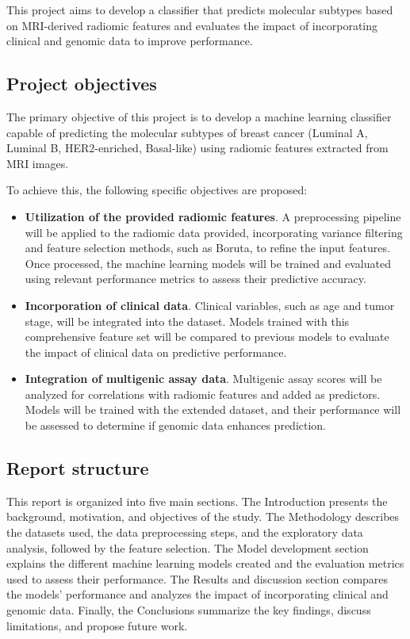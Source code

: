 \documentclass[conference]{IEEEtran}
\begin{document}
This project aims to develop a classifier that predicts molecular subtypes based on MRI-derived radiomic features and evaluates the impact of incorporating clinical and genomic data to improve performance.

\subsection{Project objectives}

The primary objective of this project is to develop a machine learning classifier capable of predicting the molecular subtypes of breast cancer (Luminal A, Luminal B, HER2-enriched, Basal-like) using radiomic features extracted from MRI images.

To achieve this, the following specific objectives are proposed:

\begin{itemize}
	\item \textbf{Utilization of the provided radiomic features}. A preprocessing pipeline will be applied to the radiomic data provided, incorporating variance filtering and feature selection methods, such as Boruta, to refine the input features. Once processed, the machine learning models will be trained and evaluated using relevant performance metrics to assess their predictive accuracy.

	\item \textbf{Incorporation of clinical data}. Clinical variables, such as age and tumor stage, will be integrated into the dataset. Models trained with this comprehensive feature set will be compared to previous models to evaluate the impact of clinical data on predictive performance.	

	\item \textbf{Integration of multigenic assay data}. Multigenic assay scores will be analyzed for correlations with radiomic features and added as predictors. Models will be trained with the extended dataset, and their performance will be assessed to determine if genomic data enhances prediction.
\end{itemize}

\subsection{Report structure}

This report is organized into five main sections. The Introduction presents the background, motivation, and objectives of the study. The Methodology describes the datasets used, the data preprocessing steps, and the exploratory data analysis, followed by the feature selection. The Model development section explains the different machine learning models created and the evaluation metrics used to assess their performance. The Results and discussion section compares the models' performance and analyzes the impact of incorporating clinical and genomic data. Finally, the Conclusions summarize the key findings, discuss limitations, and propose future work.
\end{document}
